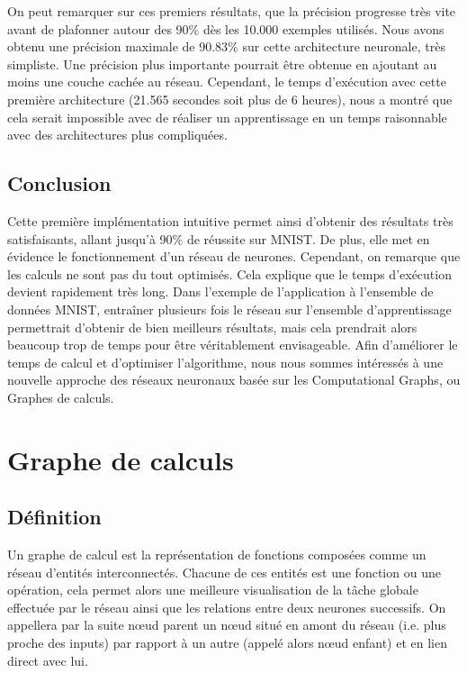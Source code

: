 \documentclass{report}
\begin{document}
On peut remarquer sur ces premiers résultats, que la précision progresse très vite avant de plafonner autour des 90\% dès les 10.000 exemples utilisés. Nous avons obtenu une précision maximale de 90.83\% sur cette architecture neuronale, très simpliste. Une précision plus importante pourrait être obtenue en ajoutant au moins une couche cachée au réseau. Cependant, le temps d'exécution avec cette première architecture (21.565 secondes soit plus de 6 heures), nous a montré que cela serait impossible avec de réaliser un apprentissage en un temps raisonnable avec des architectures plus compliquées.
\label{resultat_premiere_implementation}


\section{Conclusion}
Cette première implémentation intuitive permet ainsi d'obtenir des résultats très satisfaisants, allant jusqu'à 90\% de réussite sur MNIST. De plus, elle met en évidence le fonctionnement d'un réseau de neurones. Cependant, on remarque que les calculs ne sont pas du tout optimisés. Cela explique que le temps d'exécution devient rapidement très long. Dans l'exemple de l'application à l'ensemble de données MNIST, entraîner plusieurs fois le réseau sur l'ensemble d'apprentissage permettrait d'obtenir de bien meilleurs résultats, mais cela prendrait alors beaucoup trop de temps pour être véritablement envisageable.
Afin d'améliorer le temps de calcul et d'optimiser l'algorithme, nous nous sommes intéressés à une nouvelle approche des réseaux neuronaux basée sur les Computational Graphs, ou Graphes de calculs.

\chapter{Graphe de calculs}

\section{Définition}

Un graphe de calcul est la représentation de fonctions composées comme un réseau d’entités interconnectés. Chacune de ces entités est une fonction ou une opération, cela permet alors une meilleure visualisation de la tâche globale effectuée par le réseau ainsi que les relations entre deux neurones successifs. On appellera par la suite nœud parent un nœud situé en amont du réseau (i.e. plus proche des inputs) par rapport à un autre (appelé alors nœud enfant) et en lien direct avec lui. 
\end{document}
